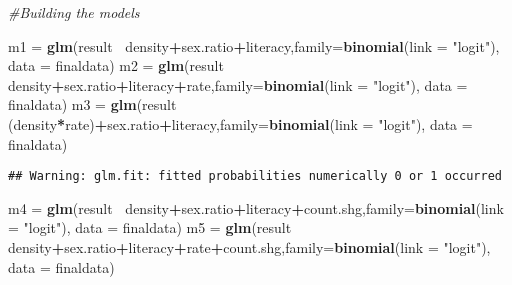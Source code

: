 \documentclass[]{article}
\newenvironment{Shaded}{\begin{snugshade}}{\end{snugshade}}
\newcommand{\KeywordTok}[1]{\textcolor[rgb]{0.13,0.29,0.53}{\textbf{#1}}}
\newcommand{\DataTypeTok}[1]{\textcolor[rgb]{0.13,0.29,0.53}{#1}}
\newcommand{\StringTok}[1]{\textcolor[rgb]{0.31,0.60,0.02}{#1}}
\newcommand{\CommentTok}[1]{\textcolor[rgb]{0.56,0.35,0.01}{\textit{#1}}}
\newcommand{\OperatorTok}[1]{\textcolor[rgb]{0.81,0.36,0.00}{\textbf{#1}}}
\newcommand{\NormalTok}[1]{#1}
\begin{document}
\begin{Shaded}
\begin{Highlighting}[]
\CommentTok{#Building the models}

\NormalTok{m1 =}\StringTok{ }\KeywordTok{glm}\NormalTok{(result}\OperatorTok{~}\StringTok{ }\NormalTok{density}\OperatorTok{+}\NormalTok{sex.ratio}\OperatorTok{+}\NormalTok{literacy,}\DataTypeTok{family=}\KeywordTok{binomial}\NormalTok{(}\DataTypeTok{link =} \StringTok{"logit"}\NormalTok{), }\DataTypeTok{data =}\NormalTok{ finaldata)}
\NormalTok{m2 =}\StringTok{ }\KeywordTok{glm}\NormalTok{(result}\OperatorTok{~}\StringTok{ }\NormalTok{density}\OperatorTok{+}\NormalTok{sex.ratio}\OperatorTok{+}\NormalTok{literacy}\OperatorTok{+}\NormalTok{rate,}\DataTypeTok{family=}\KeywordTok{binomial}\NormalTok{(}\DataTypeTok{link =} \StringTok{"logit"}\NormalTok{), }\DataTypeTok{data =}\NormalTok{ finaldata)}
\NormalTok{m3 =}\StringTok{ }\KeywordTok{glm}\NormalTok{(result}\OperatorTok{~}\StringTok{ }\NormalTok{(density}\OperatorTok{*}\NormalTok{rate)}\OperatorTok{+}\NormalTok{sex.ratio}\OperatorTok{+}\NormalTok{literacy,}\DataTypeTok{family=}\KeywordTok{binomial}\NormalTok{(}\DataTypeTok{link =} \StringTok{"logit"}\NormalTok{), }\DataTypeTok{data =}\NormalTok{ finaldata)}
\end{Highlighting}
\end{Shaded}

\begin{verbatim}
## Warning: glm.fit: fitted probabilities numerically 0 or 1 occurred
\end{verbatim}

\begin{Shaded}
\begin{Highlighting}[]
\NormalTok{m4 =}\StringTok{ }\KeywordTok{glm}\NormalTok{(result}\OperatorTok{~}\StringTok{ }\NormalTok{density}\OperatorTok{+}\NormalTok{sex.ratio}\OperatorTok{+}\NormalTok{literacy}\OperatorTok{+}\NormalTok{count.shg,}\DataTypeTok{family=}\KeywordTok{binomial}\NormalTok{(}\DataTypeTok{link =} \StringTok{"logit"}\NormalTok{), }\DataTypeTok{data =}\NormalTok{ finaldata)}
\NormalTok{m5 =}\StringTok{ }\KeywordTok{glm}\NormalTok{(result}\OperatorTok{~}\StringTok{ }\NormalTok{density}\OperatorTok{+}\NormalTok{sex.ratio}\OperatorTok{+}\NormalTok{literacy}\OperatorTok{+}\NormalTok{rate}\OperatorTok{+}\NormalTok{count.shg,}\DataTypeTok{family=}\KeywordTok{binomial}\NormalTok{(}\DataTypeTok{link =} \StringTok{"logit"}\NormalTok{), }\DataTypeTok{data =}\NormalTok{ finaldata)}
\end{Highlighting}
\end{Shaded}
\end{document}
